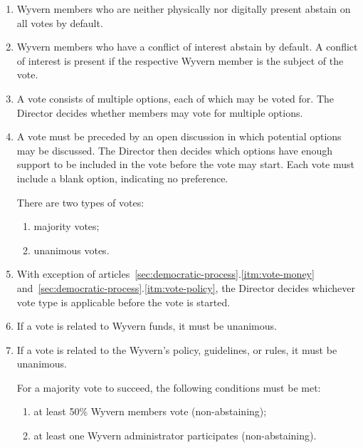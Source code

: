 \begin{enumerate}
    \item Wyvern members who are neither physically nor digitally present abstain on all votes by default.

    \item Wyvern members who have a conflict of interest abstain by default. A conflict of interest is present if the respective Wyvern member is the subject of the vote.

    \item A vote consists of multiple options, each of which may be voted for. The Director decides whether members may vote for multiple options.
    
    \item A vote must be preceded by an open discussion in which potential options may be discussed. The Director then decides which options have enough support to be included in the vote before the vote may start. Each vote must include a blank option, indicating no preference.

    \begin{item}
        There are two types of votes:
        \begin{enumerate}
            \item majority votes;
            \item unanimous votes.
        \end{enumerate}
    \end{item}

    \item With exception of articles~\ref{sec:democratic-process}.\ref{itm:vote-money} and~\ref{sec:democratic-process}.\ref{itm:vote-policy}, the Director decides whichever vote type is applicable before the vote is started.

    \item \label{itm:vote-money} If a vote is related to Wyvern funds, it must be unanimous.

    \item \label{itm:vote-policy} If a vote is related to the Wyvern's policy, guidelines, or rules, it must be unanimous.

    \begin{item}
        For a majority vote to succeed, the following conditions must be met:
        \begin{enumerate}
            \item at least 50\% Wyvern members vote (non-abstaining);
            \item at least one Wyvern administrator participates (non-abstaining).
        \end{enumerate}
    \end{item}


\end{enumerate}
